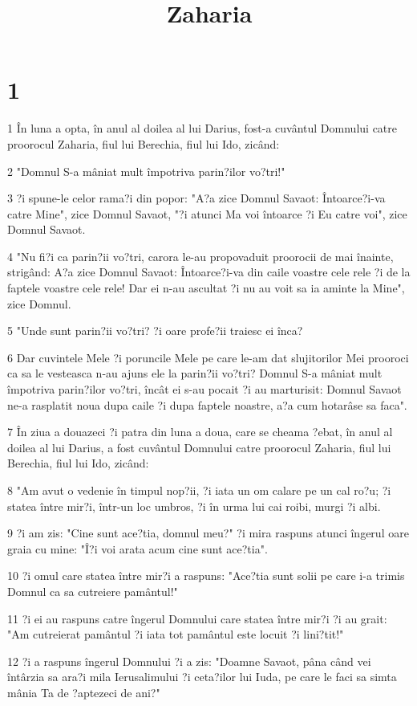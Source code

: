 

\title{Zaharia}


\chapter{1}

\par 1 În luna a opta, în anul al doilea al lui Darius, fost-a cuvântul Domnului catre proorocul Zaharia, fiul lui Berechia, fiul lui Ido, zicând:
\par 2 "Domnul S-a mâniat mult împotriva parin?ilor vo?tri!"
\par 3 ?i spune-le celor rama?i din popor: "A?a zice Domnul Savaot: Întoarce?i-va catre Mine", zice Domnul Savaot, "?i atunci Ma voi întoarce ?i Eu catre voi", zice Domnul Savaot.
\par 4 "Nu fi?i ca parin?ii vo?tri, carora le-au propovaduit proorocii de mai înainte, strigând: A?a zice Domnul Savaot: Întoarce?i-va din caile voastre cele rele ?i de la faptele voastre cele rele! Dar ei n-au ascultat ?i nu au voit sa ia aminte la Mine", zice Domnul.
\par 5 "Unde sunt parin?ii vo?tri? ?i oare profe?ii traiesc ei înca?
\par 6 Dar cuvintele Mele ?i poruncile Mele pe care le-am dat slujitorilor Mei prooroci ca sa le vesteasca n-au ajuns ele la parin?ii vo?tri? Domnul S-a mâniat mult împotriva parin?ilor vo?tri, încât ei s-au pocait ?i au marturisit: Domnul Savaot ne-a rasplatit noua dupa caile ?i dupa faptele noastre, a?a cum hotarâse sa faca".
\par 7 În ziua a douazeci ?i patra din luna a doua, care se cheama ?ebat, în anul al doilea al lui Darius, a fost cuvântul Domnului catre proorocul Zaharia, fiul lui Berechia, fiul lui Ido, zicând:
\par 8 "Am avut o vedenie în timpul nop?ii, ?i iata un om calare pe un cal ro?u; ?i statea între mir?i, într-un loc umbros, ?i în urma lui cai roibi, murgi ?i albi.
\par 9 ?i am zis: "Cine sunt ace?tia, domnul meu?" ?i mira raspuns atunci îngerul oare graia cu mine: "Î?i voi arata acum cine sunt ace?tia".
\par 10 ?i omul care statea între mir?i a raspuns: "Ace?tia sunt solii pe care i-a trimis Domnul ca sa cutreiere pamântul!"
\par 11 ?i ei au raspuns catre îngerul Domnului care statea între mir?i ?i au grait: "Am cutreierat pamântul ?i iata tot pamântul este locuit ?i lini?tit!"
\par 12 ?i a raspuns îngerul Domnului ?i a zis: "Doamne Savaot, pâna când vei întârzia sa ara?i mila Ierusalimului ?i ceta?ilor lui Iuda, pe care le faci sa simta mânia Ta de ?aptezeci de ani?"
